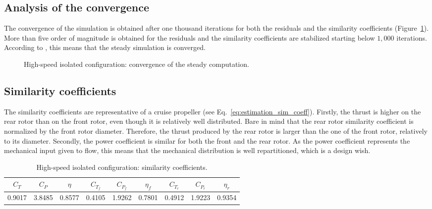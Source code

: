 
\subsection{Analysis of the convergence}
\label{sub:dream_hs_steady_conv}

The convergence of the simulation is obtained 
after one thousand iterations for both
the residuals and the similarity coefficients 
(Figure~\ref{fig:dream_HS_convergence_roe2}). More than
five order of magnitude is obtained for the residuals and
the similarity coefficients are stabilized starting below
$1,000$ iterations. According to \citet{Casey2000},
this means that the steady simulation is converged.
\begin{figure}[htp]
  \centering
  \caption{High-speed isolated configuration: convergence of the steady
  computation.}
  \label{fig:dream_HS_convergence_roe2}
\end{figure}

\subsection{Similarity coefficients}
\label{sub:dream_hs_sim_coeff}

The similarity coefficients are representative of a cruise
propeller (see Eq.~\eqref{eq:estimation_sim_coeff}). 
Firstly, the thrust is higher
on the rear rotor than on the front rotor, even though it is
relatively well distributed. Bare in mind that the rear rotor
similarity coefficient is normalized by the front rotor diameter. Therefore, 
the thrust produced by the rear rotor is larger than the one of the front rotor, 
relatively to its diameter. 
Secondly, the power coefficient is similar for both the front and the
rear rotor. As the power coefficient represents the mechanical input
given to flow, this means that the mechanical distribution is 
well repartitioned, which is a design wish.
\begin{table}[htp]
   \centering
  \begin{tabular}{ccc|cccccc}
    \toprule
    $C_T$ & $C_P$ & $\eta$ & $C_{T_f}$ & $C_{P_f}$ & $\eta_f$ & $C_{T_r}$ & $C_{P_r}$ & $\eta_r$ \\
    \midrule
    0.9017 & 3.8485 & 0.8577 & 0.4105 & 1.9262 & 0.7801 & 0.4912 & 1.9223 & 0.9354 \\
    \bottomrule
  \end{tabular}
  \caption{High-speed isolated configuration: similarity coefficients.}
  \label{tab:dream_HS_sim_coeff}
\end{table}


